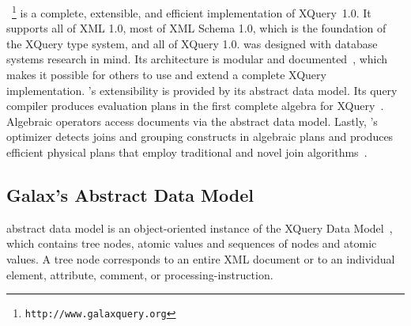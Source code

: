 \Galax{}~\footnote{\texttt{http://www.galaxquery.org}} is a complete,
extensible, and efficient implementation of XQuery~1.0.  It supports
all of XML 1.0, most of XML Schema 1.0, which is the foundation of the
XQuery type system, and all of XQuery 1.0.  \Galax{} was designed with
database systems research in mind.  Its architecture is modular and
documented~\cite{galax-edbt2004}, which makes it possible for others
to use and extend a complete XQuery implementation.  \Galax{}'s
extensibility is provided by its abstract data model.  Its query
compiler produces evaluation plans in the first complete algebra for
XQuery~\cite{galax-icde2006}.  Algebraic operators access documents
via the abstract data model.  Lastly, \Galax{}'s optimizer detects
joins and grouping constructs in algebraic plans and produces
efficient physical plans that employ traditional and novel join
algorithms~\cite{galax-icde2006}.

\subsection{Galax's Abstract Data Model}

\Galax{} abstract data model is an object-oriented instance of the
XQuery Data Model~\cite{xquerydm}, which contains tree nodes, atomic
values and sequences of nodes and atomic values.  A tree node
corresponds to an entire XML document or to an individual element,
attribute, comment, or processing-instruction.

